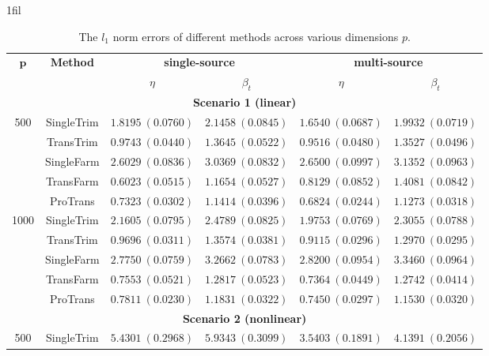 \documentclass[12pt]{article}
\makeatletter
\newcommand*{\centerfloat}{%
  \parindent \z@
  \leftskip \z@ \@plus 1fil \@minus \marginparwidth
  \rightskip \leftskip
  \parfillskip \z@skip}
\makeatother
\begin{document}
\begin{table}[!ht]
\renewcommand{\arraystretch}{0.6}
\footnotesize
\centerfloat
\caption{The $l_1$ norm errors of different methods across various dimensions $p$.}
\label{table:l1_norm_p_sd}
\begin{tabular}{cccccc}
        \toprule
        \multirow{2}{*}{$\bm{p}$} & \multirow{2}{*}{\textbf{Method}} & \multicolumn{2}{c}{\textbf{single-source}} & \multicolumn{2}{c}{\textbf{multi-source}}\\
        \cmidrule(lr){3-4} \cmidrule(lr){5-6} 
        & & $\eta$ & $\beta_{t}$ & $\eta$& $\beta_{t}$ \\
        \midrule
        \multicolumn{6}{c}{\textbf{Scenario 1 (linear)}}\\
        \hline
        \multirow{5}{*}{500}
& SingleTrim  & $1.8195\ (0.0760)$ & $2.1458\ (0.0845)$ & $1.6540\ (0.0687)$ & $1.9932\ (0.0719)$ \\
& TransTrim   & $0.9743\ (0.0440)$ & $1.3645\ (0.0522)$ & $0.9516\ (0.0480)$ & $1.3527\ (0.0496)$ \\
& SingleFarm  & $2.6029\ (0.0836)$ & $3.0369\ (0.0832)$ & $2.6500\ (0.0997)$ & $3.1352\ (0.0963)$ \\
& TransFarm   & $0.6023\ (0.0515)$ & $1.1654\ (0.0527)$ & $0.8129\ (0.0852)$ & $1.4081\ (0.0842)$ \\
& ProTrans    & $\bm{0.7323}\ (0.0302)$ & $\bm{1.1414}\ (0.0396)$ & $\bm{0.6824}\ (0.0244)$ & $\bm{1.1273}\ (0.0318)$ \\
\hline
\multirow{5}{*}{1000}
& SingleTrim  & $2.1605\ (0.0795)$ & $2.4789\ (0.0825)$ & $1.9753\ (0.0769)$ & $2.3055\ (0.0788)$ \\
& TransTrim   & $0.9696\ (0.0311)$ & $1.3574\ (0.0381)$ & $0.9115\ (0.0296)$ & $1.2970\ (0.0295)$ \\
& SingleFarm  & $2.7750\ (0.0759)$ & $3.2662\ (0.0783)$ & $2.8200\ (0.0954)$ & $3.3460\ (0.0964)$ \\
& TransFarm   & $0.7553\ (0.0521)$ & $1.2817\ (0.0523)$ & $0.7364\ (0.0449)$ & $1.2742\ (0.0414)$ \\
& ProTrans    & $\bm{0.7811}\ (0.0230)$ & $\bm{1.1831}\ (0.0322)$ & $\bm{0.7450}\ (0.0297)$ & $\bm{1.1530}\ (0.0320)$ \\
        \hline
         \multicolumn{6}{c}{\textbf{Scenario 2 (nonlinear)}}\\
         \hline
        \multirow{5}{*}{500}
& SingleTrim  & $5.4301\ (0.2968)$ & $5.9343\ (0.3099)$ & $3.5403\ (0.1891)$ & $4.1391\ (0.2056)$ \\

\end{tabular}
\end{table}
\end{document}
